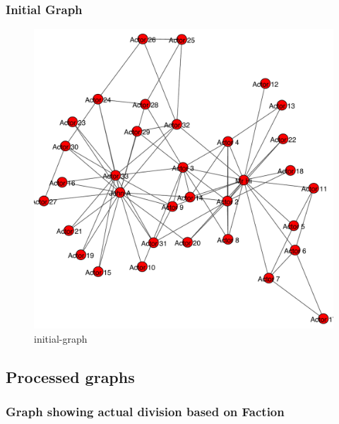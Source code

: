 \documentclass[12pt]{article}
\begin{document}
\subsubsection{Initial Graph}
\begin{figure}[ht]
\includegraphics[scale=0.7]{../qn2/graph3.pdf}
\centering
\caption{initial-graph}
\label{fig:initial-graph}
\end{figure}
\newpage
\subsection{Processed graphs}
\subsubsection{Graph showing actual division based on Faction}
\end{document}
